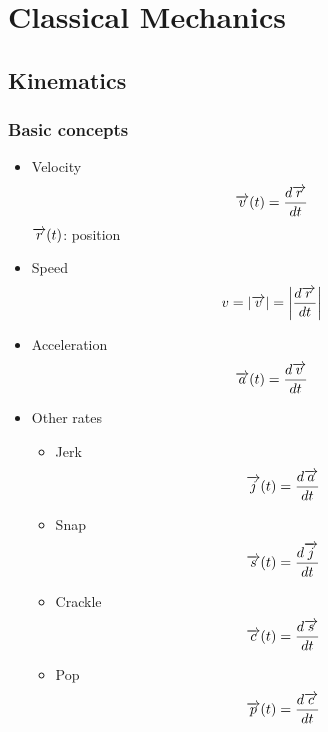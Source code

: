 \chapter{Classical Mechanics}

\section{Kinematics}
    \subsection{Basic concepts}
        \begin{itemize}
            \item Velocity
                \begin{equation*}
                    \overrightarrow{v}(t)=\frac{d\overrightarrow{r}}{dt}
                \end{equation*}
                $\overrightarrow{r}(t)$: position
            \item Speed
                \begin{equation*}
                    v=\left|\overrightarrow{v}\right|=\left|\frac{d\overrightarrow{r}}{dt}\right|
                \end{equation*}
            \item Acceleration
                \begin{equation*}
                    \overrightarrow{a}(t)=\dfrac{d\overrightarrow{v}}{dt}
                \end{equation*}
            \item Other rates
                \begin{itemize}
                    \item Jerk
                        \begin{equation*}
                            \overrightarrow{j}(t)=\dfrac{d\overrightarrow{a}}{dt}
                        \end{equation*}
                    \item Snap
                        \begin{equation*}
                            \overrightarrow{s}(t)=\dfrac{d\overrightarrow{j}}{dt}
                        \end{equation*}
                    \item Crackle
                        \begin{equation*}
                            \overrightarrow{c}(t)=\dfrac{d\overrightarrow{s}}{dt}
                        \end{equation*}
                    \item Pop
                        \begin{equation*}
                            \overrightarrow{p}(t)=\dfrac{d\overrightarrow{c}}{dt}
                        \end{equation*}
                \end{itemize}
        \end{itemize}
